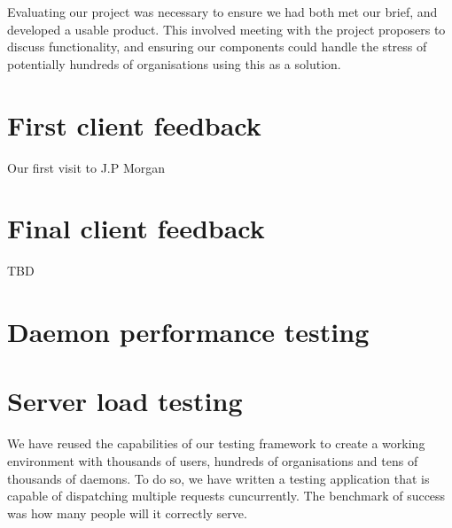\documentclass{l3proj}
\begin{document}
Evaluating our project was necessary to ensure we had both met our brief, and developed a usable product. This involved meeting with the project proposers to discuss functionality, and ensuring our components could handle the stress of potentially hundreds of organisations using this as a solution.


\section{First client feedback}

Our first visit to J.P Morgan

\section{Final client feedback}

TBD


\section{Daemon performance testing}


\section{Server load testing}

We have reused the capabilities of our testing framework to create a working environment with thousands of users, hundreds of organisations and tens of thousands of daemons. To do so, we have written a testing application that is capable of dispatching multiple requests cuncurrently. The benchmark of success was how many people will it correctly serve.


\end{document}
